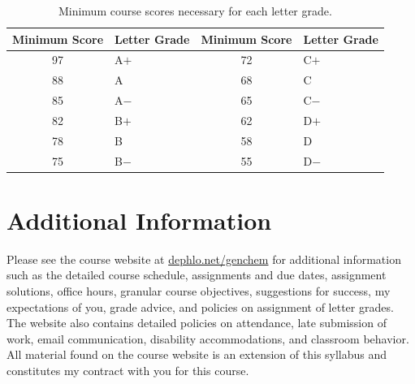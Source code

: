 \documentclass[letterpaper,oneside,onecolumn,11pt,article]{memoir}
\begin{document}
\begin{table}[h]
\caption{\sffamily Minimum course scores necessary for each letter grade.}
\label{tab:lettergrades}
\begin{tabular}{cl||cl} \toprule
\textbf{Minimum Score} & \textbf{Letter Grade} & \textbf{Minimum Score} & \textbf{Letter Grade} \\ \hline
97 & \hspace{0.3in}A$+$ & 72 & \hspace{0.3in}C$+$ \\
88 & \hspace{0.3in}A & 68 & \hspace{0.3in}C \\
85 & \hspace{0.3in}A$-$ & 65 & \hspace{0.3in}C$-$ \\
82 & \hspace{0.3in}B$+$ & 62 & \hspace{0.3in}D$+$ \\
78 & \hspace{0.3in}B & 58 & \hspace{0.3in}D \\
75 & \hspace{0.3in}B$-$ & 55 & \hspace{0.3in}D$-$ \\
\bottomrule
\end{tabular}
\end{table}
%
%
\section{Additional Information}
Please see the course website at \href{http://dephlo.net/genchem}{dephlo.net/genchem} for additional information such as the detailed course schedule, assignments and due dates, assignment solutions, office hours, granular course objectives, suggestions for success, my expectations of you, grade advice, and policies on assignment of letter grades. The website also contains detailed policies on attendance, late submission of work, email communication, disability accommodations, and classroom behavior. All material found on the course website is an extension of this syllabus and constitutes my contract with you for this course. 
%
%
\end{document}
